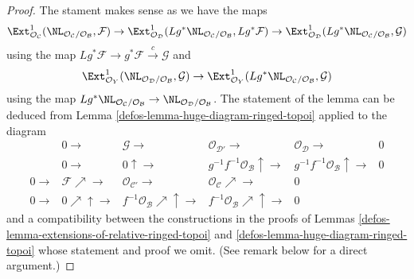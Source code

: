 \begin{proof}

The stament makes sense as we have the maps
$$
\Ext^1_{\mathcal{O}_\mathcal{C}}(
\NL_{\mathcal{O}_\mathcal{C}/\mathcal{O}_\mathcal{B}}, \mathcal{F}) \to
\Ext^1_{\mathcal{O}_\mathcal{D}}(
Lg^*\NL_{\mathcal{O}_\mathcal{C}/\mathcal{O}_\mathcal{B}}, Lg^*\mathcal{F}) \to
\Ext^1_{\mathcal{O}_\mathcal{D}}
(Lg^*\NL_{\mathcal{O}_\mathcal{C}/\mathcal{O}_\mathcal{B}}, \mathcal{G})
$$
using the map $Lg^*\mathcal{F} \to g^*\mathcal{F} \xrightarrow{c} \mathcal{G}$
and
$$
\Ext^1_{\mathcal{O}_Y}(
\NL_{\mathcal{O}_\mathcal{D}/\mathcal{O}_\mathcal{B}}, \mathcal{G}) \to
\Ext^1_{\mathcal{O}_Y}(
Lg^*\NL_{\mathcal{O}_\mathcal{C}/\mathcal{O}_\mathcal{B}}, \mathcal{G})
$$
using the map $Lg^*\NL_{\mathcal{O}_\mathcal{C}/\mathcal{O}_\mathcal{B}} \to
\NL_{\mathcal{O}_\mathcal{D}/\mathcal{O}_\mathcal{B}}$.
The statement of the lemma can be deduced from
Lemma \ref{defos-lemma-huge-diagram-ringed-topoi} applied to the diagram
$$
\begin{array}{cccccc} & 0 \longrightarrow & \mathcal{G} \longrightarrow & \mathcal{O}_{\mathcal{D}'} \longrightarrow & \mathcal{O}_\mathcal{D} \longrightarrow & 0 \\  & 0 \longrightarrow & 0 \uparrow\longrightarrow & g^{-1}f^{-1}\mathcal{O}_\mathcal{B} \uparrow\longrightarrow & g^{-1}f^{-1}\mathcal{O}_\mathcal{B} \uparrow\longrightarrow & 0 \\ 0 \longrightarrow & \mathcal{F} \nearrow\longrightarrow & \mathcal{O}_{\mathcal{C}'} \longrightarrow & \mathcal{O}_\mathcal{C} \nearrow\longrightarrow & 0 &  \\ 0 \longrightarrow & 0 \nearrow\uparrow\longrightarrow & f^{-1}\mathcal{O}_\mathcal{B} \nearrow\uparrow\longrightarrow & f^{-1}\mathcal{O}_\mathcal{B} \nearrow\uparrow\longrightarrow & 0 & \end{array}
$$
and a compatibility between the constructions in the proofs
of Lemmas \ref{defos-lemma-extensions-of-relative-ringed-topoi} and
\ref{defos-lemma-huge-diagram-ringed-topoi}
whose statement and proof we omit. (See remark below for a direct argument.)
\end{proof}

